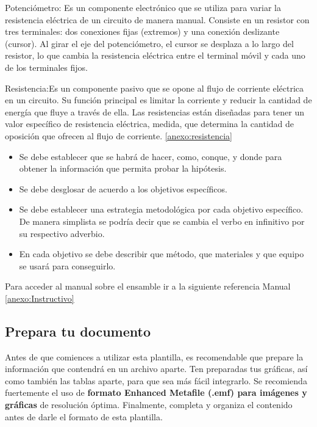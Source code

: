     Potenciómetro:  Es un componente electrónico que se utiliza para variar la resistencia eléctrica de un circuito de manera manual. Consiste en un resistor con tres terminales: dos conexiones fijas (extremos) y una conexión deslizante (cursor). Al girar el eje del potenciómetro, el cursor se desplaza a lo largo del resistor, lo que cambia la resistencia eléctrica entre el terminal móvil y cada uno de los terminales fijos.
    
     Resistencia:Es un componente pasivo que se opone al flujo de corriente eléctrica en un circuito. Su función principal es limitar la corriente y reducir la cantidad de energía que fluye a través de ella. Las resistencias están diseñadas para tener un valor específico de resistencia eléctrica, medida, que determina la cantidad de oposición que ofrecen al flujo de corriente.
    \ref{anexo:resistencia}
    
    
    \begin{itemize}
        \item Se debe establecer que se habrá de hacer, como, conque, y donde para obtener la información que permita probar la hipótesis.  
        \item Se debe desglosar de acuerdo a los objetivos específicos. 
        \item Se debe establecer una estrategia metodológica por cada objetivo específico. De manera simplista se podría decir que se cambia el verbo en infinitivo por su respectivo adverbio.
        \item En cada objetivo se debe describir que método, que materiales y que equipo se usará para conseguirlo.
    \end{itemize}
    Para acceder al manual sobre el ensamble ir a la siguiente referencia
    Manual \ref{anexo:Instructivo}
    
    \subsection{Prepara tu documento}
    
    Antes de que comiences a utilizar esta plantilla, es recomendable que prepare la información que contendrá en un archivo aparte. 
    Ten preparadas tus gráficas, así como también las tablas aparte, para que sea más fácil integrarlo. 
    Se recomienda fuertemente el uso de \textbf{formato Enhanced Metafile (.emf) para imágenes y gráficas} de resolución óptima. 
    Finalmente, completa y organiza el contenido antes de darle el formato de esta plantilla. 
    
